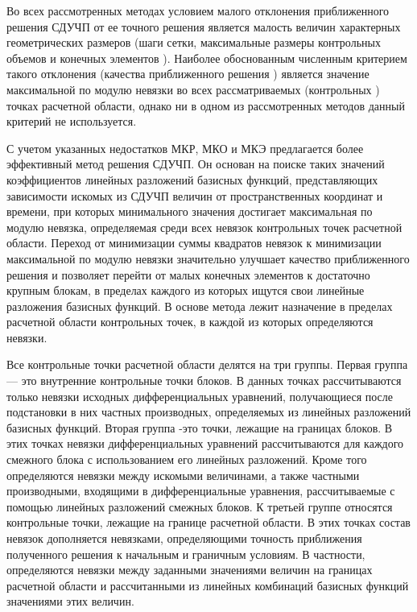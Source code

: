 \documentclass[a4paper,12pt]{article}
\begin{document}
  Во всех рассмотренных методах условием малого отклонения
  приближенного решения СДУЧП от ее точного решения является малость
  величин характерных геометрических размеров (шаги сетки,
  максимальные размеры контрольных объемов и конечных элементов
  ). Наиболее обоснованным численным критерием такого отклонения
  (качества приближенного решения ) является значение максимальной по
  модулю невязки во всех рассматриваемых (контрольных ) точках
  расчетной области, однако ни в одном из рассмотренных методов данный
  критерий не используется.
  
  С учетом указанных недостатков МКР, МКО и МКЭ предлагается более
  эффективный метод решения СДУЧП. Он основан на поиске таких значений
  коэффициентов линейных разложений базисных функций, представляющих
  зависимости искомых из СДУЧП величин от пространственных координат и
  времени, при которых минимального значения достигает максимальная по
  модулю невязка, определяемая среди всех невязок контрольных точек
  расчетной области. Переход от минимизации суммы квадратов невязок к
  минимизации максимальной по модулю невязки значительно улучшает
  качество приближенного решения и позволяет перейти от малых конечных
  элементов к достаточно крупным блокам, в пределах каждого из которых
  ищутся свои линейные разложения базисных функций. В основе метода
  лежит назначение в пределах расчетной области контрольных точек, в
  каждой из которых определяются невязки.
  
  Все контрольные точки расчетной области делятся на три
  группы. Первая группа — это внутренние контрольные точки блоков. В
  данных точках рассчитываются только невязки исходных
  дифференциальных уравнений, получающиеся после подстановки в них
  частных производных, определяемых из линейных разложений базисных
  функций. Вторая группа -это точки, лежащие на границах блоков. В
  этих точках невязки дифференциальных уравнений рассчитываются для
  каждого смежного блока с использованием его линейных
  разложений. Кроме того определяются невязки между искомыми
  величинами, а также частными производными, входящими в
  дифференциальные уравнения, рассчитываемые с помощью линейных
  разложений смежных блоков. К третьей группе относятся контрольные
  точки, лежащие на границе расчетной области. В этих точках состав
  невязок дополняется невязками, определяющими точность приближения
  полученного решения к начальным и граничным условиям. В частности,
  определяются невязки между заданными значениями величин на границах
  расчетной области и рассчитанными из линейных комбинаций базисных
  функций значениями этих величин.
  
\end{document}
